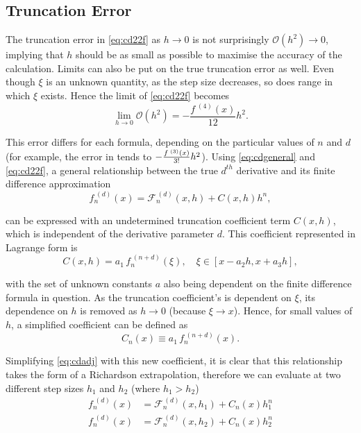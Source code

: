 \subsection{Truncation Error}\label{sec:truncerr}

The truncation error in \cref{eq:cd22f} as $h\!\to\!0$ is not surprisingly $\mathcal{O}(h^2)\!\to\!0$, implying that $h$ should be as small as possible to maximise the accuracy of the calculation.
Limits can also be put on the true truncation error as well.
Even though $\xi$ is an unknown quantity, as the step size decreases, so does range in which $\xi$ exists.
Hence the limit of \cref{eq:cd22f} becomes
\begin{equation}
\lim_{h \to 0}\mathcal{O}(h^2) =  - \frac{f^{\;(4)}(x)}{12}h^2.
\end{equation}

This error differs for each formula, depending on the particular values of $n$ and $d$ (for example, the error in  tends to $\cramped{-\frac{f^{\;(3)}(x)}{3!}h^2}$).
Using \cref{eq:cdgeneral} and \cref{eq:cd22f}, a general relationship between the true $d^{th}$ derivative and its finite difference approximation
\begin{equation}
 f_n^{\;(d)}(x) = \mathcal{F}_n^{\,(d)}(x,h) + C(x,h)h^n,\label{eq:cdadj}
\end{equation}

can be expressed with an undetermined truncation coefficient term $C(x,h)$, which is independent of the derivative parameter $d$.
This coefficient represented in Lagrange form is
\begin{equation}
C(x,h) = a_1\,f_n^{\;(n+d)}(\xi), \quad \xi \in [x-a_2h,x+a_3h],\label{eq:cdcxh}
\end{equation}

with the set of unknown constants $a$ also being dependent on the finite difference formula in question.
As the truncation coefficient's is dependent on $\xi$, its dependence on $h$ is removed as $h\!\to\!0$ (because $\xi\!\to\!x$).
Hence, for small values of $h$, a simplified coefficient can be defined as
\begin{equation}
 C_n(x) \equiv a_1\,f_n^{\;(n+d)}(x).
\end{equation}

Simplifying \cref{eq:cdadj} with this new coefficient, it is clear that this relationship takes the form of a Richardson extrapolation, therefore we can evaluate at two different step sizes $h_1$ and $h_2$ (where $h_1 > h_2$)
\begin{align}
f_n^{\;(d)}(x) &= \mathcal{F}_n^{\,(d)}(x,h_1) + C_n(x)h_1^n \\
f_n^{\;(d)}(x) &= \mathcal{F}_n^{\,(d)}(x,h_2) + C_n(x)h_2^n
\end{align}

